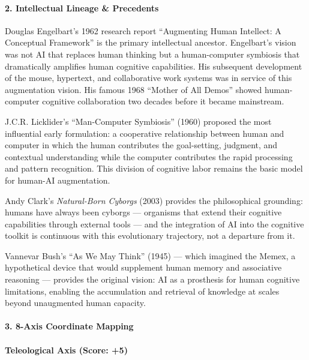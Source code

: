 \paragraph{2. Intellectual Lineage \&
Precedents}\label{intellectual-lineage-precedents-18}

Douglas Engelbart's 1962 research report ``Augmenting Human Intellect: A
Conceptual Framework'' is the primary intellectual ancestor. Engelbart's
vision was not AI that replaces human thinking but a human-computer
symbiosis that dramatically amplifies human cognitive capabilities. His
subsequent development of the mouse, hypertext, and collaborative work
systems was in service of this augmentation vision. His famous 1968
``Mother of All Demos'' showed human-computer cognitive collaboration
two decades before it became mainstream.

J.C.R. Licklider's ``Man-Computer Symbiosis'' (1960) proposed the most
influential early formulation: a cooperative relationship between human
and computer in which the human contributes the goal-setting, judgment,
and contextual understanding while the computer contributes the rapid
processing and pattern recognition. This division of cognitive labor
remains the basic model for human-AI augmentation.

Andy Clark's \emph{Natural-Born Cyborgs} (2003) provides the
philosophical grounding: humans have always been cyborgs --- organisms
that extend their cognitive capabilities through external tools --- and
the integration of AI into the cognitive toolkit is continuous with this
evolutionary trajectory, not a departure from it.

Vannevar Bush's ``As We May Think'' (1945) --- which imagined the Memex,
a hypothetical device that would supplement human memory and associative
reasoning --- provides the original vision: AI as a prosthesis for human
cognitive limitations, enabling the accumulation and retrieval of
knowledge at scales beyond unaugmented human capacity.

\paragraph{3. 8-Axis Coordinate
Mapping}\label{axis-coordinate-mapping-18}

\paragraph{Teleological Axis (Score:
+5)}\label{teleological-axis-score-5-1}

